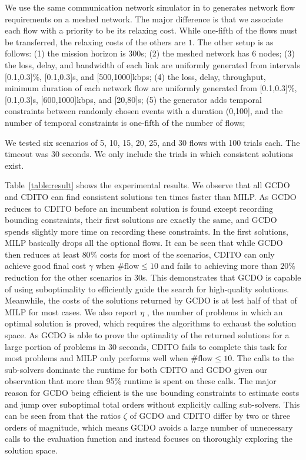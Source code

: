 \documentclass[letterpaper]{article} %
\theoremstyle{definition}
\begin{document}
We use the same communication network simulator in \cite{chen2018radmax} to generates network flow requirements on a meshed network. The major difference is that we associate each flow with a priority to be its relaxing cost. While one-fifth of the flows must be transferred, the relaxing costs of the others are $1$. The other setup is as follows: (1) the mission horizon is 300s; (2) the meshed network has 6 nodes; (3) the loss, delay, and bandwidth of each link are uniformly generated from intervals [0.1,0.3]\%, [0.1,0.3]s, and [500,1000]kbps; (4) the loss, delay, throughput, minimum duration of each network flow are uniformly generated from  [0.1,0.3]\%, [0.1,0.3]s, [600,1000]kbps, and [20,80]s; (5) the generator adds temporal constraints between randomly chosen events with a duration (0,100], and the number of temporal constraints is one-fifth of the number of flows; 

We tested six scenarios of 5, 10, 15, 20, 25, and 30 flows with 100 trials each. The timeout was 30 seconds. We only include the trials in which consistent solutions exist.

Table~\ref{table:result} shows the experimental results. We observe that all GCDO and CDITO can find consistent solutions ten times faster than MILP. As GCDO reduces to CDITO before an incumbent solution is found except recording bounding constraints, their first solutions are exactly the same, and GCDO spends slightly more time on recording these constraints.  In the first solutions, MILP basically drops all the optional flows. It can be seen that while GCDO then reduces at least $80\%$ costs for most of the scenarios, CDITO can only achieve good final cost $\gamma$ when $\#\text{flow} \leq 10$ and fails to achieving more than $20\%$ reduction for the other scenarios in 30s. This demonstrates that GCDO is capable of using suboptimality to efficiently guide the search for high-quality solutions. Meanwhile, the costs of the solutions returned by GCDO is at lest half of that of MILP for most cases.
We also report $\eta$ , the number of problems in which an optimal solution is proved, which requires the algorithms to exhaust the solution space. As GCDO is able to prove the optimality of the returned solutions for a large portion of problems in $30$ seconds, CDITO fails to complete this task for most problems and MILP only performs well when $\#\text{flow} \leq 10$. The calls to the sub-solvers dominate the runtime for both CDITO and GCDO given our observation that more than 95\% runtime is spent on these calls. The major reason for GCDO being efficient is the use bounding constraints to estimate costs and jump over suboptimal total orders without explicitly calling sub-solvers. This can be seen from that the ratios $\zeta$ of GCDO and CDITO differ by two or three orders of magnitude, which means GCDO avoids a large number of unnecessary calls to the evaluation function and instead focuses on thoroughly exploring the solution space. 
\end{document}
